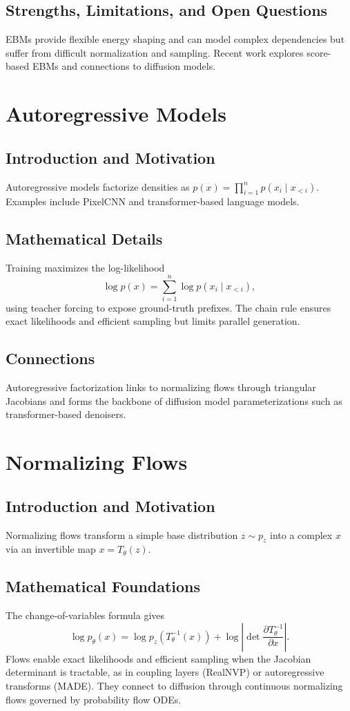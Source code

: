 \documentclass[11pt]{book}
\begin{document}
\subsection{Strengths, Limitations, and Open Questions}
EBMs provide flexible energy shaping and can model complex dependencies but suffer from difficult normalization and sampling. Recent work explores score-based EBMs and connections to diffusion models.

\section{Autoregressive Models}
\subsection{Introduction and Motivation}
Autoregressive models factorize densities as $p(x)=\prod_{i=1}^n p(x_i\mid x_{<i})$. Examples include PixelCNN and transformer-based language models.
\subsection{Mathematical Details}
Training maximizes the log-likelihood
\begin{equation}
\log p(x)=\sum_{i=1}^n \log p(x_i\mid x_{<i}),
\end{equation}
using teacher forcing to expose ground-truth prefixes. The chain rule ensures exact likelihoods and efficient sampling but limits parallel generation.
\subsection{Connections}
Autoregressive factorization links to normalizing flows through triangular Jacobians and forms the backbone of diffusion model parameterizations such as transformer-based denoisers.

\section{Normalizing Flows}
\subsection{Introduction and Motivation}
Normalizing flows \cite{rezende2015} transform a simple base distribution $z\sim p_z$ into a complex $x$ via an invertible map $x=T_\theta(z)$.
\subsection{Mathematical Foundations}
The change-of-variables formula gives
\begin{equation}
\log p_\theta(x)=\log p_z(T_\theta^{-1}(x)) + \log\left|\det \frac{\partial T_\theta^{-1}}{\partial x}\right|.
\end{equation}
Flows enable exact likelihoods and efficient sampling when the Jacobian determinant is tractable, as in coupling layers (RealNVP) or autoregressive transforms (MADE). They connect to diffusion through continuous normalizing flows governed by probability flow ODEs.
\end{document}
